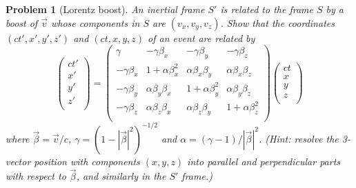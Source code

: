 \documentclass[a4paper]{article}
\theoremstyle{new}
\newtheorem{qns}{Problem}[section]
\begin{document}
\newpage
\begin{qns}[Lorentz boost]
An inertial frame $S'$ is related to the frame $S$ by a boost of $\vec{v}$ whose components in $S$ are $(v_x, v_y, v_z)$. Show that the coordinates $(ct', x', y', z')$ and $(ct, x, y, z)$ of an event are related by
$$\begin{pmatrix}ct'\\x'\\y'\\z'\\\end{pmatrix}=\begin{pmatrix}\gamma&-\gamma\beta_x&-\gamma\beta_y&-\gamma\beta_z\\-\gamma\beta_x&1+\alpha\beta_x^2&\alpha\beta_x\beta_y&\alpha\beta_x\beta_z\\-\gamma\beta_y&\alpha\beta_y\beta_x&1+\alpha\beta_y^2&\alpha\beta_y\beta_z\\-\gamma\beta_z&\alpha\beta_z\beta_x&\alpha\beta_z\beta_y&1+\alpha\beta_z^2\\\end{pmatrix}\begin{pmatrix}ct\\x\\y\\z\\\end{pmatrix}$$
where $\vec{\beta}=\vec{v}/c$, $\gamma=(1-|\vec{\beta}|^2)^{-1/2}$ and $\alpha=(\gamma-1)/|\vec{\beta}|^2$. (Hint: resolve the 3-vector position with components $(x, y, z)$ into parallel and perpendicular parts with respect to $\vec{\beta}$, and similarly in the $S'$ frame.)
\end{qns}
\end{document}
